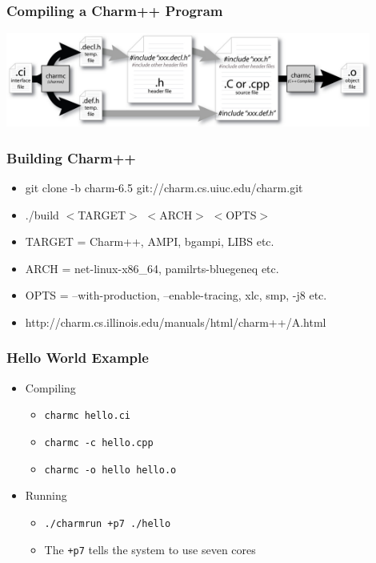 \begin{frame}
   \frametitle{Compiling a Charm++ Program}
   \begin{center}
     \includegraphics[width=0.9\textwidth]{figures/charmCompile.jpg}
   \end{center}
\end{frame}

\begin{frame}
  \frametitle{Building Charm++}
  \begin{itemize}
  \item git clone -b charm-6.5 git://charm.cs.uiuc.edu/charm.git
  \item ./build $<$TARGET$>$ $<$ARCH$>$ $<$OPTS$>$
  \item TARGET = Charm++, AMPI, bgampi, LIBS etc.
  \item ARCH = net-linux-x86\_64, pamilrts-bluegeneq etc.
  \item OPTS = --with-production, --enable-tracing, xlc, smp, -j8 etc.
  \item http://charm.cs.illinois.edu/manuals/html/charm++/A.html
  \end{itemize}
\end{frame}

\begin{frame}
  \frametitle{Hello World Example}
  \begin{itemize}
    \item Compiling
      \begin{itemize}
      \item \texttt{charmc hello.ci}
      \item \texttt{charmc -c hello.cpp}
      \item \texttt{charmc -o hello hello.o}
      \end{itemize}
    \item Running
      \begin{itemize}
      \item \texttt{./charmrun +p7 ./hello}
      \item The \texttt{+p7} tells the system to use seven cores
      \end{itemize}
    \end{itemize}
\end{frame}



